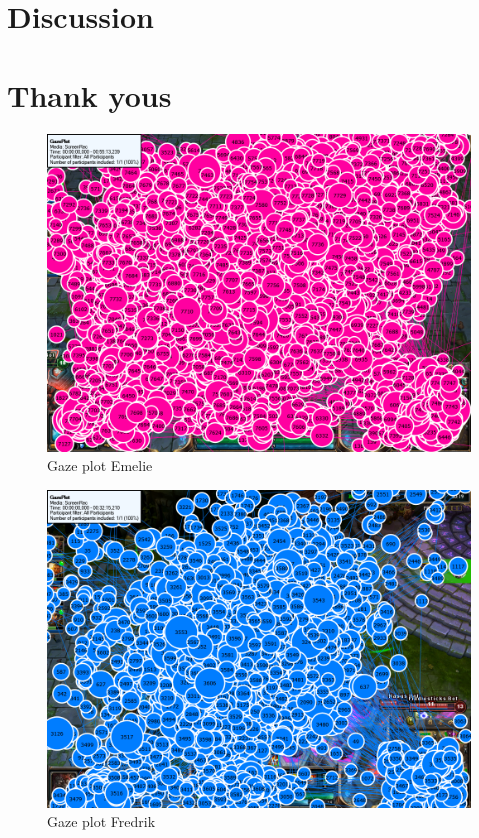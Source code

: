 \documentclass{article}
\begin{document}
\section{Discussion}

\section{Thank yous}

\begin{figure}[h!]
\begin{center}
\includegraphics*[width=0.90\columnwidth]{images/gazeplot/Emelie}
\end{center}
\caption{Gaze plot Emelie}
\label{gaze_eme}
\end{figure}

\begin{figure}[h!]
\begin{center}
\includegraphics*[width=0.90\columnwidth]{images/gazeplot/Fredrik}
\end{center}
\caption{Gaze plot Fredrik}
\label{gaze_fre}
\end{figure}
\end{document}
